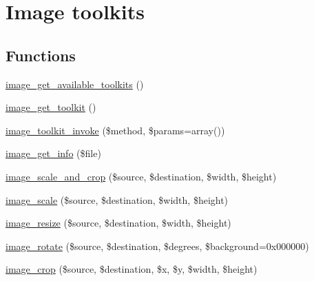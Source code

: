 \hypertarget{group__image}{
\section{Image toolkits}
\label{group__image}
}
\subsection*{Functions}
\begin{CompactItemize}
\item 
\hyperlink{group__image_g190b9b90f931916a5766ed11c29b9326}{image\_\-get\_\-available\_\-toolkits} ()
\item 
\hyperlink{group__image_g08b3ce83f3526f248c1e08b4ee249a3a}{image\_\-get\_\-toolkit} ()
\item 
\hyperlink{group__image_g5429299fdb0dd86b5c8050dc1dba5aee}{image\_\-toolkit\_\-invoke} (\$method, \$params=array())
\item 
\hyperlink{group__image_g64daec548dec0ae4c1d30053446e8f80}{image\_\-get\_\-info} (\$file)
\item 
\hyperlink{group__image_g61e985c6a47a4c9d788b99fba2d452a6}{image\_\-scale\_\-and\_\-crop} (\$source, \$destination, \$width, \$height)
\item 
\hyperlink{group__image_g4015f61f8b5214787a6f649befd4b7bb}{image\_\-scale} (\$source, \$destination, \$width, \$height)
\item 
\hyperlink{group__image_g160782a6325283b224cba85e2a4d3839}{image\_\-resize} (\$source, \$destination, \$width, \$height)
\item 
\hyperlink{group__image_g6827b6bfbfee059fa956f5c3d6f0d716}{image\_\-rotate} (\$source, \$destination, \$degrees, \$background=0x000000)
\item 
\hyperlink{group__image_ge43902efb776c55596b28161e835cd9e}{image\_\-crop} (\$source, \$destination, \$x, \$y, \$width, \$height)
\end{CompactItemize}
